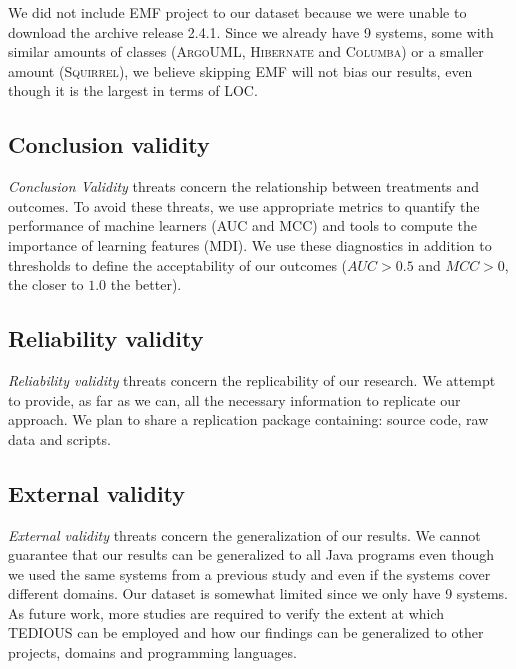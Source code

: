 We did not include \textsc{EMF} project to our dataset because we were unable to download the archive release 2.4.1. Since we already have 9 systems, some with similar amounts of classes (\textsc{ArgoUML}, \textsc{Hibernate} and \textsc{Columba}) or a smaller amount (\textsc{Squirrel}), we believe skipping \textsc{EMF} will not bias our results, even though it is the largest in terms of LOC.

\subsection{Conclusion validity}


\textit{Conclusion Validity} threats concern the relationship between treatments and outcomes. To avoid these threats, we use appropriate metrics to quantify the performance of machine learners (AUC and MCC) and tools to compute the importance of learning features (MDI). We use these diagnostics in addition to thresholds to define the acceptability of our outcomes ($AUC>0.5$ and $MCC>0$, the closer to $1.0$ the better).

\subsection{Reliability validity}


\textit{Reliability validity} threats concern the replicability of our research. We attempt to provide, as far as we can, all the necessary information to replicate our approach. We plan to share a replication package containing: source code, raw data and scripts.

\subsection{External validity}


\textit{External validity} threats concern the generalization of our results. We cannot guarantee that our results can be generalized to all Java programs even though we used the same systems from a previous study \citep{maldonado17} and even if the systems cover different domains. Our dataset is somewhat limited since we only have 9 systems. As future work, more studies are required to verify the extent at which TEDIOUS can be employed and how our findings can be generalized to other projects, domains and programming languages.








